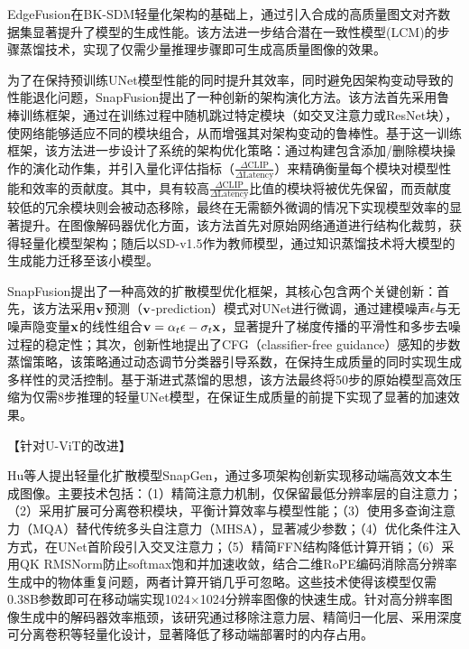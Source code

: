 \documentclass[11pt,a4paper,UTF8]{ctexart}
\begin{document}
EdgeFusion\cite{castells2024edgefusion}在BK-SDM轻量化架构的基础上，通过引入合成的高质量图文对齐数据集显著提升了模型的生成性能。该方法进一步结合潜在一致性模型(LCM)的步骤蒸馏技术，实现了仅需少量推理步骤即可生成高质量图像的效果。

为了在保持预训练UNet模型性能的同时提升其效率，同时避免因架构变动导致的性能退化问题，SnapFusion\cite{li2023snapfusion}提出了一种创新的架构演化方法。该方法首先采用鲁棒训练框架，通过在训练过程中随机跳过特定模块（如交叉注意力或ResNet块），使网络能够适应不同的模块组合，从而增强其对架构变动的鲁棒性。基于这一训练框架，该方法进一步设计了系统的架构优化策略：通过构建包含添加/删除模块操作的演化动作集，并引入量化评估指标（$\frac{\Delta\text{CLIP}}{\Delta\text{Latency}}$）来精确衡量每个模块对模型性能和效率的贡献度。其中，具有较高$\frac{\Delta\text{CLIP}}{\Delta\text{Latency}}$比值的模块将被优先保留，而贡献度较低的冗余模块则会被动态移除，最终在无需额外微调的情况下实现模型效率的显著提升。在图像解码器优化方面，该方法首先对原始网络通道进行结构化裁剪，获得轻量化模型架构；随后以SD-v1.5作为教师模型，通过知识蒸馏技术将大模型的生成能力迁移至该小模型。

SnapFusion\cite{li2023snapfusion}提出了一种高效的扩散模型优化框架，其核心包含两个关键创新：首先，该方法采用$\mathbf{v}$预测（$\mathbf{v}$-prediction）模式对UNet进行微调，通过建模噪声$\epsilon$与无噪声隐变量$\mathbf{x}$的线性组合$\mathbf{v}=\alpha_t\epsilon-\sigma_t\mathbf{x}$，显著提升了梯度传播的平滑性和多步去噪过程的稳定性；其次，创新性地提出了CFG（classifier-free guidance）感知的步数蒸馏策略，该策略通过动态调节分类器引导系数，在保持生成质量的同时实现生成多样性的灵活控制。基于渐进式蒸馏的思想，该方法最终将50步的原始模型高效压缩为仅需8步推理的轻量UNet模型，在保证生成质量的前提下实现了显著的加速效果。

【针对U-ViT的改进】

Hu等人\cite{hu2024snapgen}提出轻量化扩散模型SnapGen，通过多项架构创新实现移动端高效文本生成图像。主要技术包括：（1）精简注意力机制，仅保留最低分辨率层的自注意力；（2）采用扩展可分离卷积\cite{howard2017mobilenets}模块，平衡计算效率与模型性能；（3）使用多查询注意力（MQA）\cite{shazeer2019fast}替代传统多头自注意力（MHSA），显著减少参数；（4）优化条件注入方式，在UNet首阶段引入交叉注意力；（5）精简FFN结构降低计算开销；（6）采用QK RMSNorm\cite{henry2020query,zhang2019root}防止softmax饱和并加速收敛，结合二维RoPE编码\cite{su2024roformer}消除高分辨率生成中的物体重复问题，两者计算开销几乎可忽略。这些技术使得该模型仅需0.38B参数即可在移动端实现1024×1024分辨率图像的快速生成。针对高分辨率图像生成中的解码器效率瓶颈，该研究通过移除注意力层、精简归一化层、采用深度可分离卷积等轻量化设计，显著降低了移动端部署时的内存占用。
\end{document}
